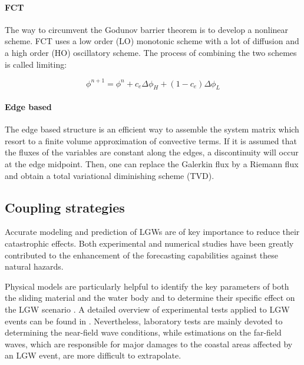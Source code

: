 \paragraph*{FCT} The way to circumvent the Godunov barrier theorem \cite{godunov1959} is to develop a nonlinear scheme. FCT uses a low order (LO) monotonic scheme with a lot of diffusion and a high order (HO) oscillatory scheme. The process of combining the two schemes is called limiting:

\begin{equation}
\phi^{n+1} = \phi^n + c_e\Delta \phi_H + (1-c_e)\Delta \phi_L
\end{equation}

\paragraph*{Edge based} The edge based structure is an efficient way to assemble the system matrix which resort to a
finite volume approximation of convective terms. If it is assumed that the fluxes of the variables are constant along the edges, a discontinuity will occur at the edge midpoint. Then, one can replace the Galerkin flux by a Riemann flux and obtain a total variational diminishing scheme (TVD).





\subsection{Coupling strategies}


Accurate modeling and prediction of LGWs are of key importance to reduce their catastrophic effects.
Both experimental and numerical studies have been greatly contributed to the enhancement of the forecasting capabilities against these natural hazards.

Physical models are particularly helpful to identify the key parameters of both the sliding material and the water body and to determine their specific effect on the LGW scenario \cite{noda1970water, fritz2004near, heller2011wave, mohammed2012physical, romano2016, mulligan2017, evers2019spatial}. A detailed overview of experimental tests applied to LGW events can be found in \cite{yavari2017subaerial}. Nevertheless, laboratory tests are mainly devoted to determining the near-field wave conditions, while estimations on the far-field waves, which are responsible for major damages to the coastal areas affected by an LGW event, are more difficult to extrapolate.


